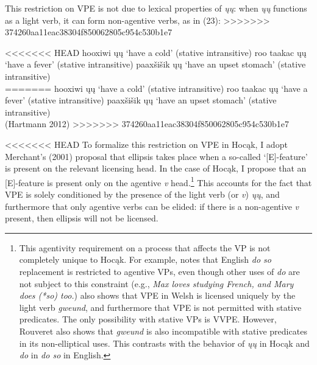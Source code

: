 \documentclass[output=paper]{LSP/langsci}
\begin{document}
This restriction on VPE is not due to lexical properties of \emph{\k{u}\k{u}}: when \emph{\k{u}\k{u}} functions as a light verb, it can form non-agentive verbs, as in (23):
>>>>>>> 374260aa11eac38304f850062805c954c530b1e7


\begin{singlespacing}
\begin{exe}
\ex
\begin{xlist}
\ex
<<<<<<< HEAD
hooxiwi ųų `have a cold' (stative intransitive)
\vspace{12pt}
\ex
roo taakac ųų `have a fever' (stative intransitive)
\vspace{12pt}
\ex
paaxšišik ųų `have an upset stomach' (stative intransitive)\\
\citep{Hartmann2012}
=======
hooxiwi \k{u}\k{u} `have a cold' (stative intransitive)
\vspace{12pt}
\ex
roo taakac \k{u}\k{u} `have a fever' (stative intransitive)
\vspace{12pt}
\ex
paax\v{s}i\v{s}ik \k{u}\k{u} `have an upset stomach' (stative intransitive)\\
(Hartmann 2012)
>>>>>>> 374260aa11eac38304f850062805c954c530b1e7
\end{xlist}
\end{exe}
\end{singlespacing}

<<<<<<< HEAD
To formalize this restriction on VPE in Hocąk, I adopt Merchant's (2001) proposal that ellipsis takes place when a so-called `[E]-feature' is present on the relevant licensing head. In the case of Hocąk, I propose that an [E]-feature is present only on the agentive \emph{v} head.\footnote{This agentivity requirement on a process that affects the VP is not completely unique to Hocąk. For example, \citet{Hallman2004} notes that English \emph{do so} replacement is restricted to agentive VPs, even though other uses of \emph{do} are not subject to this constraint (e.g., \emph{Max loves studying French, and Mary does (*so) too.}) \citet{Rouveret2012} also shows that VPE in Welsh is licensed uniquely by the light verb \emph{gweund}, and furthermore that VPE is not permitted with stative predicates. The only possibility with stative VPs is VVPE. However, Rouveret also shows that \emph{gweund} is also incompatible with stative predicates in its non-elliptical uses. This contrasts with the behavior of \emph{ųų} in Hocąk and \emph{do} in \emph{do so} in English.}  This accounts for the fact that VPE is solely conditioned by the presence of the light verb (or \emph{v}) \emph{ųų}, and furthermore that only agentive verbs can be elided: if there is a non-agentive \emph{v} present, then ellipsis will not be licensed. 
\end{document}
